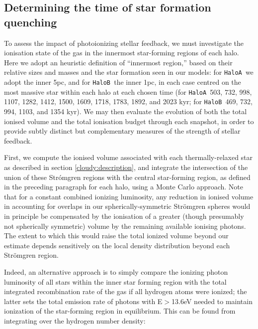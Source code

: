 \documentclass[graphics, twocolumn, usenatbib]{mn2e}
\newcommand{\ha} {\texttt{HaloA~}}
\newcommand{\hb} {\texttt{HaloB~}}
\begin{document}
\subsection{Determining the time of star formation quenching}\label{cloudy:results}

To assess the impact of photoionizing stellar feedback, we must investigate the ionisation state of the gas in the innermost star-forming regions of each halo. Here we adopt an heuristic definition of ``innermost region,'' based on their relative sizes and masses and the star formation seen in our models: for \ha we adopt the inner 5pc, and for \hb the inner 1pc, in each case centred on the most massive star within each halo at each chosen time (for \ha 503, 732, 998, 1107, 1282, 1412, 1500, 1609, 1718, 1783, 1892, and 2023 kyr; for \hb 469, 732, 994, 1103, and 1354 kyr). We may then evaluate the evolution of both the total ionised volume and the total ionisation budget through each snapshot, in order to provide subtly distinct but complementary measures of the strength of stellar feedback.

First, we compute the ionised volume associated with each thermally-relaxed star as described in section \ref{cloudy:description}, and integrate the intersection of the union of these Str{\' o}mgren regions with the central star-forming region, as defined in the preceding paragraph for each halo, using a Monte Carlo approach.
Note that for a constant combined ionizing luminosity, any reduction in ionised volume in accounting for overlaps in our spherically-symmetric Str{\"o}mgren spheres would in principle be compensated by the ionisation of a greater (though presumably not spherically symmetric) volume by the remaining available ionising photons. The extent to which this would raise the total ionized volume beyond our estimate depends sensitively on the local density distribution beyond each Str{\" o}mgren region.

Indeed, an alternative approach is to simply compare the ionizing photon luminosity of all stars within the inner star forming region with the total integrated recombination rate of the gas if all hydrogen atoms were ionized; the latter sets the total emission rate of photons with E$>$13.6eV needed to maintain ionization of the star-forming region in equilibrium. This can be found from integrating over the hydrogen number density:
\end{document}
